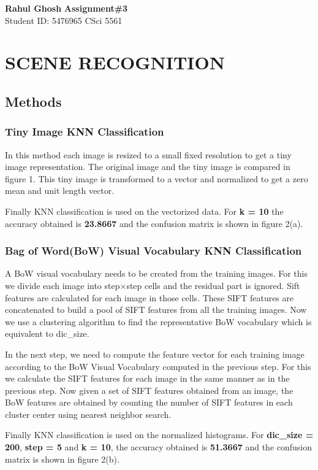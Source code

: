 \documentclass[letter, 11pt]{article}
\begin{document}
\noindent
\large \textbf{Rahul Ghosh} \hfill \textbf{Assignment\#3}\\
\normalsize Student ID: 5476965 \hfill CSci 5561\\

\section*{SCENE RECOGNITION}
\subsection*{Methods}
\subsubsection*{Tiny Image KNN Classification}
In this method each image is resized to a small fixed resolution to get a tiny image representation. The original image and the tiny image is compared in figure 1. This tiny image is transformed to a vector and normalized to get a zero mean and unit length vector. 

Finally KNN classification is used on the vectorized data. For \textbf{k = 10} the accuracy obtained is \textbf{23.8667} and the confusion matrix is shown in figure 2(a).

\subsubsection*{Bag of Word(BoW) Visual Vocabulary KNN Classification}
A BoW visual vocabulary needs to be created from the training images. For this we divide each image into step$\times$step cells and the residual part is ignored. Sift features are calculated for each image in those cells. These SIFT features are concatenated to build a pool of SIFT features from all the training images. Now we use a clustering algorithm to find the representative BoW vocabulary which is equivalent to dic\_size.

In the next step, we need to compute the feature vector for each training image according to the  BoW Visual Vocabulary computed in the previous step. For this we calculate the SIFT features for each image in the same manner as in the previous step. Now given a set of SIFT features obtained from an image, the BoW features are obtained by
counting the number of SIFT features in each cluster center using nearest neighbor search.

Finally KNN classification is used on the normalized histograms. For \textbf{dic\_size = 200}, \textbf{step = 5} and \textbf{k = 10}, the accuracy obtained is \textbf{51.3667} and the confusion matrix is shown in figure 2(b).
\end{document}
